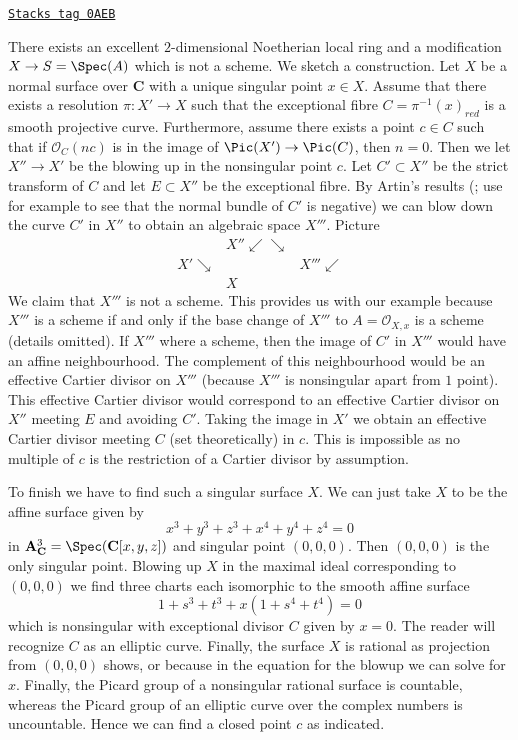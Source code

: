 \begin{example}
\label{spaces-resolve-example-not-blow-up}
\href{https://stacks.math.columbia.edu/tag/0AEB}{\texttt{Stacks tag 0AEB}}

There exists an excellent $2$-dimensional Noetherian local ring
and a modification $X \to S = \Spec(A)$ which is not a scheme.
We sketch a construction. Let $X$ be a normal surface over $\mathbf{C}$
with a unique singular point $x \in X$. Assume that there exists a
resolution $\pi : X' \to X$ such that the exceptional fibre
$C = \pi^{-1}(x)_{red}$ is a smooth projective curve. Furthermore, assume
there exists a point $c \in C$ such that if $\mathcal{O}_C(nc)$
is in the image of $\Pic(X') \to \Pic(C)$, then $n = 0$.
Then we let $X'' \to X'$ be the blowing up in the nonsingular point $c$.
Let $C' \subset X''$ be the strict transform of $C$ and let $E \subset X''$
be the exceptional fibre. By Artin's results
(\cite{ArtinII}; use for example \cite{Mumford-topology}
to see that the normal bundle of $C'$ is negative)
we can blow down the curve $C'$ in $X''$ to obtain an algebraic space $X'''$.
Picture
$$
\begin{array}{ccc} & X'' \swarrow\searrow &  \\ X' \searrow &  & X''' \swarrow \\  & X & \end{array}
$$
We claim that $X'''$ is not a scheme. This provides us with our example
because $X'''$ is a scheme if and only if the base change of $X'''$
to $A = \mathcal{O}_{X, x}$ is a scheme (details omitted).
If $X'''$ where a scheme, then the image of $C'$ in $X'''$ would
have an affine neighbourhood. The complement of this neighbourhood
would be an effective Cartier divisor on $X'''$ (because $X'''$ is
nonsingular apart from $1$ point). This effective Cartier divisor would
correspond to an effective Cartier divisor on $X''$
meeting $E$ and avoiding $C'$. Taking the image in $X'$ we obtain
an effective Cartier divisor meeting $C$ (set theoretically) in $c$.
This is impossible as no multiple of $c$ is the restriction of a Cartier
divisor by assumption.

\medskip\noindent
To finish we have to find such a singular surface $X$. We can just take
$X$ to be the affine surface given by
$$
x^3 + y^3 + z^3 + x^4 + y^4 + z^4 = 0
$$
in $\mathbf{A}^3_\mathbf{C} = \Spec(\mathbf{C}[x, y, z])$ and singular point
$(0, 0, 0)$. Then $(0, 0, 0)$ is the only singular point. Blowing up $X$
in the maximal ideal corresponding to $(0, 0, 0)$ we find three charts each
isomorphic to the smooth affine surface
$$
1 + s^3 + t^3 + x(1 + s^4 + t^4) = 0
$$
which is nonsingular with exceptional divisor $C$ given by $x = 0$. The reader
will recognize $C$ as an elliptic curve. Finally, the surface $X$ is rational
as projection from $(0, 0, 0)$ shows, or because in the equation for the
blowup we can solve for $x$. Finally, the Picard group of a nonsingular
rational surface is countable, whereas the Picard group of an elliptic
curve over the complex numbers is uncountable. Hence we can find a closed
point $c$ as indicated.
\end{example}



